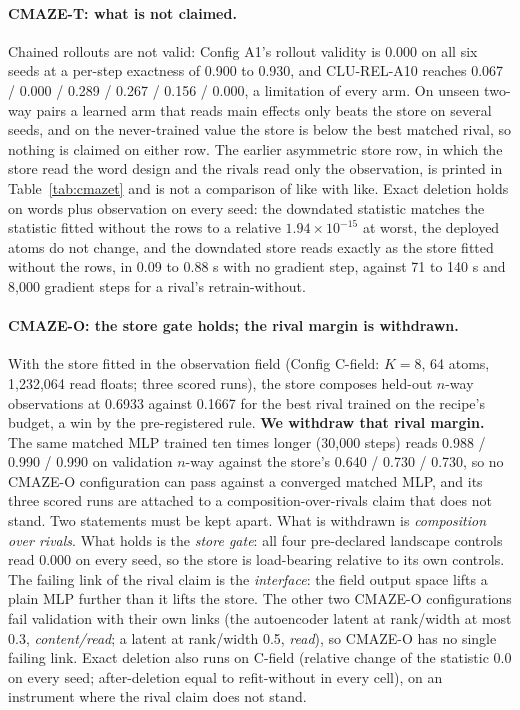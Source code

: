 \documentclass{article} %
\newcommand{\sci}[2]{\ensuremath{#1\times10^{#2}}}
\begin{document}
\paragraph{CMAZE-T: what is not claimed.} Chained rollouts are not valid: Config A1's rollout validity
is 0.000 on all six seeds at a per-step exactness of 0.900 to 0.930, and CLU-REL-A10 reaches 0.067 /
0.000 / 0.289 / 0.267 / 0.156 / 0.000, a limitation of every arm. On unseen two-way pairs a learned
arm that reads main effects only beats the store on several seeds, and on the never-trained value the
store is below the best matched rival, so nothing is claimed on either row. The earlier asymmetric
store row, in which the store read the word design and the rivals read only the observation, is
printed in Table~\ref{tab:cmazet} and is not a comparison of like with like. Exact deletion holds on
words plus observation on every seed: the downdated statistic matches the statistic fitted without
the rows to a relative \sci{1.94}{-15} at worst, the deployed atoms do not change, and the downdated
store reads exactly as the store fitted without the rows, in 0.09 to 0.88 s with no gradient step,
against 71 to 140 s and 8,000 gradient steps for a rival's retrain-without.

\paragraph{CMAZE-O: the store gate holds; the rival margin is withdrawn.} With the store fitted in
the observation field (Config C-field: $K=8$, 64 atoms, 1,232,064 read floats; three scored runs), the store
composes held-out $n$-way observations at 0.6933 against 0.1667 for the best rival trained on the
recipe's budget, a win by the pre-registered rule. \textbf{We withdraw that rival
margin.} The same matched MLP trained ten times longer (30,000 steps) reads 0.988 / 0.990 / 0.990 on
validation $n$-way against the store's 0.640 / 0.730 / 0.730, so no CMAZE-O configuration can pass
against a converged matched MLP, and its three scored runs are attached to a composition-over-rivals claim that
does not stand. Two statements must be kept apart. What is withdrawn is \emph{composition over
rivals}. What holds is the \emph{store gate}: all four pre-declared landscape controls read 0.000 on every seed,
so the store is load-bearing relative to its own controls. The failing link of the rival claim is
the \emph{interface}: the field output space lifts a plain MLP further than it lifts the store. The
other two CMAZE-O configurations fail validation with their own links (the autoencoder latent at
rank/width at most 0.3, \emph{content/read}; a latent at rank/width 0.5, \emph{read}), so CMAZE-O has
no single failing link. Exact deletion also runs on C-field (relative change of the statistic 0.0 on
every seed; after-deletion equal to refit-without in every cell), on an instrument where the rival
claim does not stand.
\end{document}
